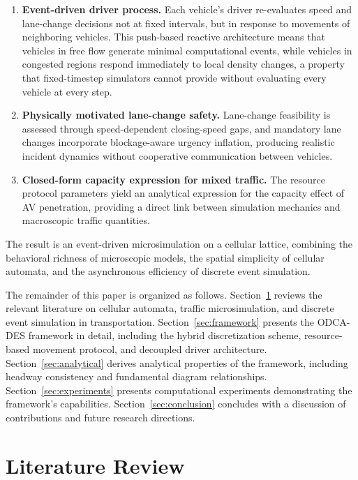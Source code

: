 \documentclass[review,authoryear]{elsarticle}
\begin{document}
\begin{enumerate}
    \item \textbf{Event-driven driver process.} Each vehicle's driver re-evaluates speed and lane-change decisions not at fixed intervals, but in response to movements of neighboring vehicles. This push-based reactive architecture means that vehicles in free flow generate minimal computational events, while vehicles in congested regions respond immediately to local density changes, a property that fixed-timestep simulators cannot provide without evaluating every vehicle at every step.

    \item \textbf{Physically motivated lane-change safety.} Lane-change feasibility is assessed through speed-dependent closing-speed gaps, and mandatory lane changes incorporate blockage-aware urgency inflation, producing realistic incident dynamics without cooperative communication between vehicles.

    \item \textbf{Closed-form capacity expression for mixed traffic.} The resource protocol parameters yield an analytical expression for the capacity effect of AV penetration, providing a direct link between simulation mechanics and macroscopic traffic quantities.
\end{enumerate}

The result is an event-driven microsimulation on a cellular lattice, combining the behavioral richness of microscopic models, the spatial simplicity of cellular automata, and the asynchronous efficiency of discrete event simulation.

The remainder of this paper is organized as follows. Section~\ref{sec:literature} reviews the relevant literature on cellular automata, traffic microsimulation, and discrete event simulation in transportation. Section~\ref{sec:framework} presents the ODCA-DES framework in detail, including the hybrid discretization scheme, resource-based movement protocol, and decoupled driver architecture. Section~\ref{sec:analytical} derives analytical properties of the framework, including headway consistency and fundamental diagram relationships. Section~\ref{sec:experiments} presents computational experiments demonstrating the framework's capabilities. Section~\ref{sec:conclusion} concludes with a discussion of contributions and future research directions.


\section{Literature Review}
\label{sec:literature}
\end{document}
